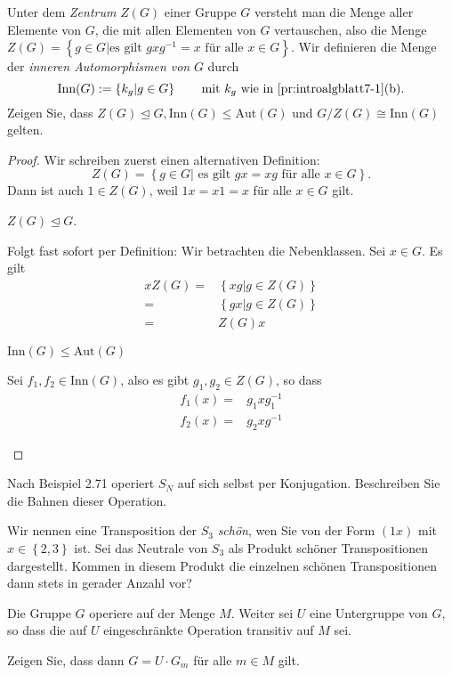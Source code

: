 \begin{Problem}
	Unter dem \emph{Zentrum} $Z(G)$ einer Gruppe $G$ versteht man die Menge aller Elemente von $G$, die mit allen Elementen von $G$ vertauschen, also die Menge $Z(G)=\left\{ g\in G|\text{es gilt }gxg^{-1}=x\text{ f\"{u}r alle }x\in G \right\} $. Wir definieren die Menge der \emph{inneren Automorphismen von} $G$ durch
\[
	\text{Inn}(G):=\left\{ k_g|g\in G \right\} \qquad\text{mit }k_g\text{ wie in \ref{pr:introalgblatt7-1}(b)}
.\] 
Zeigen Sie, dass $Z(G)\trianglelefteq G,\text{Inn}(G)\le \text{Aut}(G)$ und $G / Z(G)\cong \text{Inn}(G)$ gelten.
\end{Problem}
\begin{proof}
	Wir schreiben zuerst einen alternativen Definition:
	\[
		Z(G)=\left\{ g\in G|\text{ es gilt }gx=xg\text{ f\"{u}r alle }x\in G \right\} 
	.\] 
	Dann ist auch $1\in Z(G)$, weil $1x=x 1=x$ f\"{u}r alle $x\in G$ gilt.
	\begin{parts}
	\item $Z(G)\trianglelefteq G$.

		Folgt fast sofort per Definition: Wir betrachten die Nebenklassen. Sei $x\in G$. Es gilt
		\begin{align*}
			xZ(G)=&\left\{ xg|g\in Z(G) \right\}\\
		=&\left\{ gx|g\in Z(G) \right\} \\
		=& Z(G)x
		\end{align*}
	\item $\text{Inn}(G)\le \text{Aut}(G)$

		Sei $f_1,f_2\in\text{Inn}(G)$, also es gibt $g_1,g_2\in Z(G)$, so dass
		\begin{align*}
			f_1(x)=&g_1xg_1^{-1}\\
			f_2(x)=&g_2xg^{-1}
		\end{align*}
	\end{parts}
\end{proof}
\begin{Problem}
	\begin{parts}
	\item Nach Beispiel 2.71 operiert $S_N$ auf sich selbst per Konjugation. Beschreiben Sie die Bahnen dieser Operation.
	\item Wir nennen eine Transposition der $S_3$ \emph{schön}, wen Sie von der Form $(1x)$ mit $x\in \left\{ 2,3 \right\} $ ist. Sei das Neutrale von $S_3$ als Produkt schöner Transpositionen dargestellt. Kommen in diesem Produkt die einzelnen schönen Transpositionen dann stets in gerader Anzahl vor? 
	\end{parts}
\end{Problem}

\begin{Problem}
	Die Gruppe $G$ operiere auf der Menge $M$. Weiter sei $U$ eine Untergruppe von $G$, so dass die auf $U$ eingeschränkte Operation transitiv auf $M$ sei.

	Zeigen Sie, dass dann $G=U\cdot G_m$ f\"{u}r alle $m\in M$ gilt.
\end{Problem}
